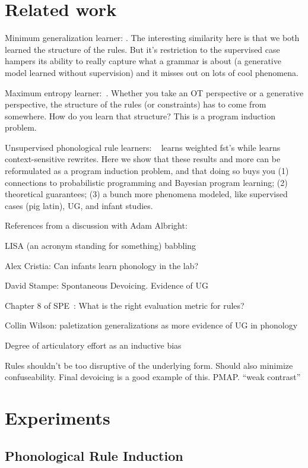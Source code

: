 \documentclass{article}
\begin{document}
\section{Related work}

Minimum generalization learner: \cite{Albright03rulesvs}. The interesting similarity here is that we both learned the structure of the rules. But it's restriction to the supervised case hampers its ability to really capture what a grammar is about (a generative model learned without supervision) and it misses out on lots of cool phenomena.

Maximum entropy learner:~\cite{goldwater2003learning}. Whether you take an OT perspective or a generative perspective, the structure of the rules (or constraints) has to come from somewhere. How do you learn that structure? This is a program induction problem.

Unsupervised phonological rule learners:
~\cite{cotterell-peng-eisner-2015} learns weighted fst's while
\cite{rulebased} learns context-sensitive rewrites. Here we show that
these results and more can be reformulated as a program induction
problem, and that doing so buys you (1) connections to probabilistic
programming and Bayesian program learning; (2) theoretical guarantees;
(3) a bunch more phenomena modeled, like supervised cases (pig latin),
UG, and infant studies.

References from a discussion with Adam Albright:

LISA (an acronym standing for something) babbling

Alex Cristia: Can infants learn phonology in the lab?

David Stampe: Spontaneous Devoicing. Evidence of UG

Chapter 8 of SPE~\cite{chomsky1968sound}: What is the right evaluation metric for rules?

Collin Wilson: paletization generalizations as more evidence of UG in phonology

Degree of articulatory effort as an inductive bias

Rules shouldn't be too disruptive of the underlying form. Should also minimize confuseability. Final devoicing is a good example of this. PMAP. ``weak contrast''


\section{Experiments}

\subsection{Phonological Rule Induction}
\end{document}

